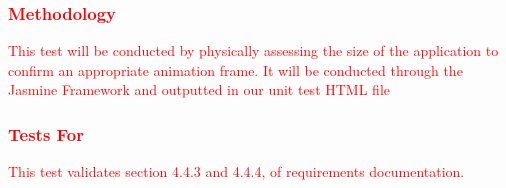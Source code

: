 \documentclass[11pt, oneside]{article}   	%
\begin{document}
\subsubsection{\textcolor{red}{Methodology}}
\textcolor{red}{This test will be conducted by physically assessing the size of the application to confirm an appropriate animation frame. It will be conducted through the Jasmine Framework and outputted in our unit test HTML file}
\subsubsection{\textcolor{red}{Tests For}}
\textcolor{red}{This test validates section 4.4.3 and 4.4.4, of requirements documentation.}
\end{document}
